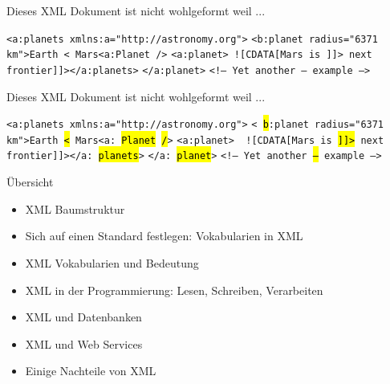\documentclass{beamer}
\makeatletter
\newcommand\SoulColor{%
	\let\set@color\beamerorig@set@color
	\let\reset@color\beamerorig@reset@color}
\makeatother
\begin{document}
\begin{frame}{Dieses XML Dokument ist nicht wohlgeformt weil ...}
	
	\texttt{<a:planets xmlns:a="http://astronomy.org">} \newline
	\texttt{<b:planet radius="6371 km">Earth < Mars<a:Planet />} \newline
	\texttt{<a:planet> ![CDATA[Mars is ]]> next frontier]]></a:planets>} \newline
	\texttt{</a:planet>}
	\texttt{<!-- Yet another -- example -->} \newline
	
\end{frame}

\begin{frame}{Dieses XML Dokument ist nicht wohlgeformt weil ...}
	
	\texttt{<a:planets xmlns:a="http://astronomy.org">} \newline
	\texttt{<\SoulColor\hl{b}:planet radius="6371 km">Earth \SoulColor\hl{<} Mars<a:\SoulColor\hl{Planet} \SoulColor\hl{/}>} \newline
	\texttt{<a:planet>\SoulColor\hl{ }![CDATA[Mars is \SoulColor\hl{]]>} next frontier]]></a:\SoulColor\hl{planets}>} \newline
	\texttt{</a:\SoulColor\hl{planet}>}
	\texttt{<!-- Yet another \SoulColor\hl{--} example -->} \newline
	
\end{frame}

\begin{frame}{Übersicht}
	
	\begin{itemize}
		\item XML Baumstruktur
		\item Sich auf einen Standard festlegen: Vokabularien in XML
		\item XML Vokabularien und Bedeutung
		\item XML in der Programmierung: Lesen, Schreiben, Verarbeiten
		\item XML und Datenbanken
		\item XML und Web Services
		\item Einige Nachteile von XML
	\end{itemize}
	
\end{frame}
\end{document}
